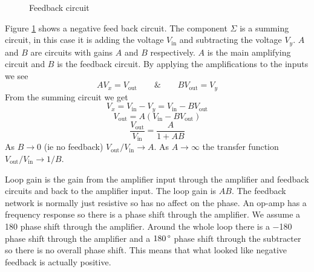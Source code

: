 \documentclass{article}
\begin{document}
    \begin{figure}[ht]
        \centering
        \caption{Feedback circuit}
        \label{fig:feedback circuit}
    \end{figure}
    Figure \ref{fig:feedback circuit} shows a negative feed back circuit. 
    The component \(\Sigma\) is a summing circuit, in this case it is adding the voltage \(V_\text{in}\) and subtracting the voltage \(V_y\).
    \(A\) and \(B\) are circuits with gains \(A\) and \(B\) respectively.
    \(A\) is the main amplifying circuit and \(B\) is the feedback circuit.
    By applying the amplifications to the inputs we see
    \[AV_x = V_\text{out}\qquad \& \qquad BV_\text{out} = V_y\]
    From the summing circuit we get
    \[V_x = V_\text{in} - V_y = V_\text{in} - BV_\text{out}\]
    \[V_\text{out} = A(V_\text{in} - BV_\text{out})\]
    \[\frac{V_\text{out}}{V_\text{in}} = \frac{A}{1 + AB}\]
    As \(B\to 0\) (ie no feedback) \(V_\text{out}/V_\text{in}\to A\).
    As \(A\to \infty\) the transfer function \(V_\text{out}/V_\text{in}\to 1/B\).
    
    Loop gain is the gain from the amplifier input through the amplifier and feedback circuits and back to the amplifier input.
    The loop gain is \(AB\).
    The feedback network is normally just resistive so has no affect on the phase.
    An op-amp has a frequency response so there is a phase shift through the amplifier.
    We assume a \SI{180}{\SIUnitSymbolDegree} phase shift through the amplifier.
    Around the whole loop there is a \SI{-180}{\SIUnitSymbolDegree} phase shift through the amplifier and a \(\SI{180}{\SIUnitSymbolDegree}\) phase shift through the subtracter so there is no overall phase shift.
    This means that what looked like negative feedback is actually positive.
    
\end{document}
